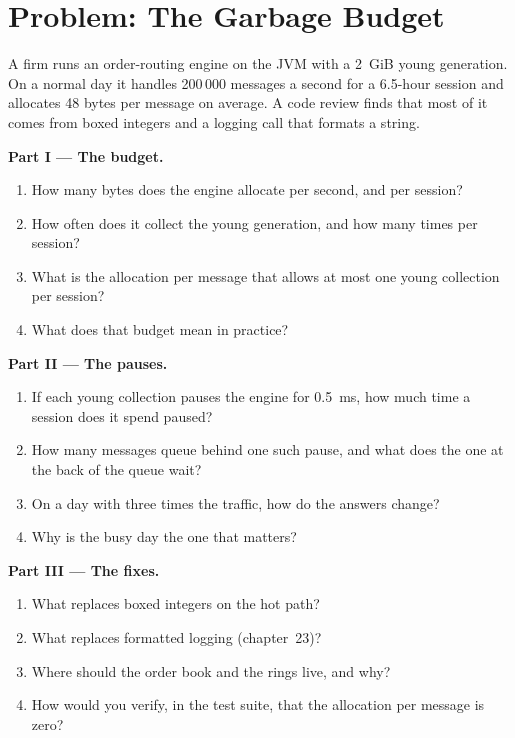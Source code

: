 \section{Problem: The Garbage Budget}

\begin{problem}\label{pb:ll:managed-and-functional-languages-on-the-desk:1}
A firm runs an order-routing engine on the JVM with a 2~GiB young generation. On a normal day it handles 200\,000 messages a
second for a 6.5-hour session and allocates 48 bytes per message on average. A code review finds that most of it comes from
boxed integers and a logging call that formats a string.

\medskip\noindent\textbf{Part I --- The budget.}
\begin{enumerate}
\item How many bytes does the engine allocate per second, and per session?
\item How often does it collect the young generation, and how many times per session?
\item What is the allocation per message that allows at most one young collection per session?
\item What does that budget mean in practice?
\end{enumerate}

\medskip\noindent\textbf{Part II --- The pauses.}
\begin{enumerate}[resume]
\item If each young collection pauses the engine for \qty{0.5}{\milli\second}, how much time a session does it spend paused?
\item How many messages queue behind one such pause, and what does the one at the back of the queue wait?
\item On a day with three times the traffic, how do the answers change?
\item Why is the busy day the one that matters?
\end{enumerate}

\medskip\noindent\textbf{Part III --- The fixes.}
\begin{enumerate}[resume]
\item What replaces boxed integers on the hot path?
\item What replaces formatted logging (chapter~23)?
\item Where should the order book and the rings live, and why?
\item How would you verify, in the test suite, that the allocation per message is zero?
\end{enumerate}


\end{problem}
